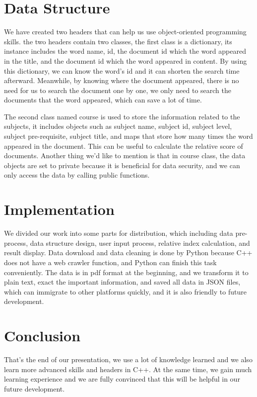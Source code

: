 \documentclass{article}
\begin{document}
\section{Data Structure}
We have created two headers that can help us use object-oriented programming skills. the two headers contain two classes, the first class is a dictionary, its instance includes the word name, id, the document id which the word appeared in the title, and the document id which the word appeared in content. By using this dictionary, we can know the word's id and it can shorten the search time afterward. Meanwhile, by knowing where the document appeared, there is no need for us to search the document one by one, we only need to search the documents that the word appeared, which can save a lot of time.

The second class named course is used to store the information related to the subjects, it includes objects such as subject name, subject id, subject level, subject pre-requisite, subject title, and maps that store how many times the word appeared in the document. This can be useful to calculate the relative score of documents. Another thing we'd like to mention is that in course class, the data objects are set to private because it is beneficial for data security, and we can only access the data by calling public functions.

\section{Implementation}
We divided our work into some parts for distribution, which including data pre-process, data structure design, user input process, relative index calculation, and result display. Data download and data cleaning is done by Python because C++ does not have a web crawler function, and Python can finish this task conveniently. The data is in pdf format at the beginning, and we transform it to plain text, exact the important information, and saved all data in JSON files, which can immigrate to other platforms quickly, and it is also friendly to future development.

\section{Conclusion}
That's the end of our presentation, we use a lot of knowledge learned and we also learn more advanced skills and headers in C++. At the same time, we gain much learning experience and we are fully convinced that this will be helpful in our future development.
\end{document}
